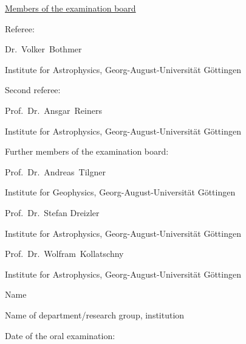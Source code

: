 \noindent \underline{Members of the examination board}
\vspace{\baselineskip}

\noindent Referee:
\medskip

Dr.~Volker~Bothmer

Institute for Astrophysics, Georg-August-Universität Göttingen
\vspace{\baselineskip}

\noindent Second referee:
\medskip

Prof.~Dr.~Ansgar~Reiners

Institute for Astrophysics, Georg-August-Universität Göttingen
% 
% 
\vspace{\baselineskip}

\noindent Further members of the examination board:
\medskip

Prof.~Dr.~Andreas~Tilgner

Institute for Geophysics, Georg-August-Universität Göttingen
\vspace{\baselineskip}

Prof.~Dr.~Stefan Dreizler

Institute for Astrophysics, Georg-August-Universität Göttingen
\vspace{\baselineskip}

Prof.~Dr.~Wolfram~Kollatschny

Institute for Astrophysics, Georg-August-Universität Göttingen
\vspace{\baselineskip}

Name

Name of department/research group, institution
\vspace{3\baselineskip}

\noindent Date of the oral examination: \underline{\hspace{3cm}}


\cleardoublepage



